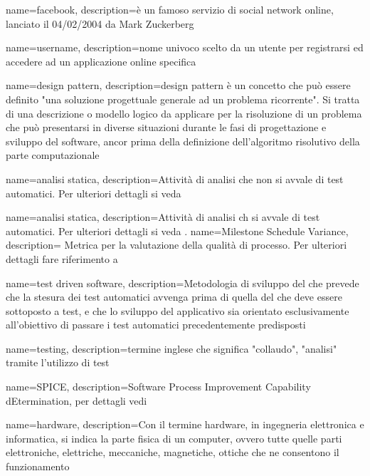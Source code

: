  {
	name=facebook,
	description={è un famoso servizio di social network online, lanciato il 04/02/2004 da Mark Zuckerberg}
}

 {
	name=username,
	description={nome univoco scelto da un utente per registrarsi ed accedere ad un applicazione online specifica}
}

 {
	name=design pattern,
	description={design pattern è un concetto che può essere definito "una soluzione progettuale generale ad un problema ricorrente". Si tratta di una descrizione o modello logico da applicare per la risoluzione di un problema che può presentarsi in diverse situazioni durante le fasi di progettazione e sviluppo del software, ancor prima della definizione dell'algoritmo risolutivo della parte computazionale}
}

 {
	name=analisi statica,
	description={Attività di analisi che non si avvale di test automatici. Per ulteriori dettagli si veda \Pdq{}}
}


 {
	name=analisi statica,
	description={Attività di analisi ch si avvale di test automatici. Per ulteriori dettagli si veda \Pdq{}.}
}
 {
	name=Milestone Schedule Variance,
	description={ Metrica per la valutazione della qualità di processo. Per ulteriori dettagli fare riferimento a \PdQ{}}
}

 {
	name=test driven software,
	description={Metodologia di sviluppo del  che prevede che la stesura dei test automatici avvenga prima di quella del  che deve essere sottoposto a  test, e che lo sviluppo del  applicativo sia orientato esclusivamente all'obiettivo di passare i test automatici precedentemente predisposti}
}

 {
	name=testing,
	description={termine inglese che significa "collaudo", "analisi" tramite l'utilizzo di test}
}

 {
	name=SPICE,
	description={Software Process Improvement Capability
		dEtermination, per dettagli vedi \PdQ}
}

 {
	name=hardware,
	description={Con il termine hardware, in ingegneria elettronica e informatica, si indica la parte fisica di un computer, ovvero tutte quelle parti elettroniche, elettriche, meccaniche, magnetiche, ottiche che ne consentono il funzionamento}
}

